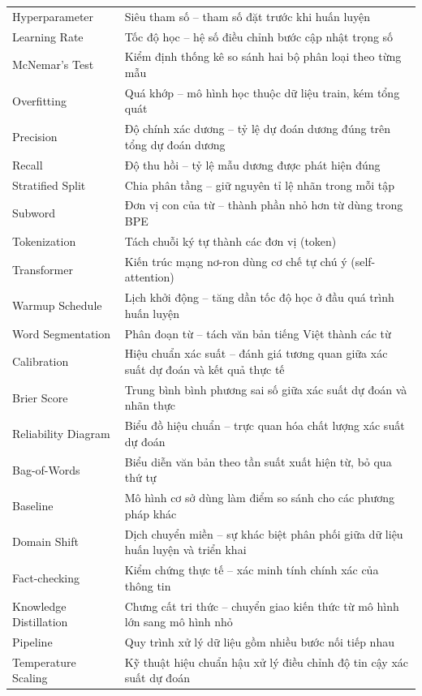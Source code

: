 \documentclass[12pt, a4paper]{report}
\begin{document}
\begin{longtable}{p{5cm} p{9cm}}
Hyperparameter      & Siêu tham số -- tham số đặt trước khi huấn luyện \\[0.3em]
Learning Rate       & Tốc độ học -- hệ số điều chỉnh bước cập nhật trọng số \\[0.3em]
McNemar's Test      & Kiểm định thống kê so sánh hai bộ phân loại theo từng mẫu \\[0.3em]
Overfitting         & Quá khớp -- mô hình học thuộc dữ liệu train, kém tổng quát \\[0.3em]
Precision           & Độ chính xác dương -- tỷ lệ dự đoán dương đúng trên tổng dự đoán dương \\[0.3em]
Recall              & Độ thu hồi -- tỷ lệ mẫu dương được phát hiện đúng \\[0.3em]
Stratified Split    & Chia phân tầng -- giữ nguyên tỉ lệ nhãn trong mỗi tập \\[0.3em]
Subword             & Đơn vị con của từ -- thành phần nhỏ hơn từ dùng trong BPE \\[0.3em]
Tokenization        & Tách chuỗi ký tự thành các đơn vị (token) \\[0.3em]
Transformer         & Kiến trúc mạng nơ-ron dùng cơ chế tự chú ý (self-attention) \\[0.3em]
Warmup Schedule     & Lịch khởi động -- tăng dần tốc độ học ở đầu quá trình huấn luyện \\[0.3em]
Word Segmentation   & Phân đoạn từ -- tách văn bản tiếng Việt thành các từ \\[0.3em]
Calibration         & Hiệu chuẩn xác suất -- đánh giá tương quan giữa xác suất dự đoán và kết quả thực tế \\[0.3em]
Brier Score         & Trung bình bình phương sai số giữa xác suất dự đoán và nhãn thực \\[0.3em]
Reliability Diagram & Biểu đồ hiệu chuẩn -- trực quan hóa chất lượng xác suất dự đoán \\[0.3em]
Bag-of-Words        & Biểu diễn văn bản theo tần suất xuất hiện từ, bỏ qua thứ tự \\[0.3em]
Baseline            & Mô hình cơ sở dùng làm điểm so sánh cho các phương pháp khác \\[0.3em]
Domain Shift        & Dịch chuyển miền -- sự khác biệt phân phối giữa dữ liệu huấn luyện và triển khai \\[0.3em]
Fact-checking       & Kiểm chứng thực tế -- xác minh tính chính xác của thông tin \\[0.3em]
Knowledge Distillation & Chưng cất tri thức -- chuyển giao kiến thức từ mô hình lớn sang mô hình nhỏ \\[0.3em]
Pipeline            & Quy trình xử lý dữ liệu gồm nhiều bước nối tiếp nhau \\[0.3em]
Temperature Scaling & Kỹ thuật hiệu chuẩn hậu xử lý điều chỉnh độ tin cậy xác suất dự đoán \\
\bottomrule
\end{longtable}
\newpage
\end{document}
